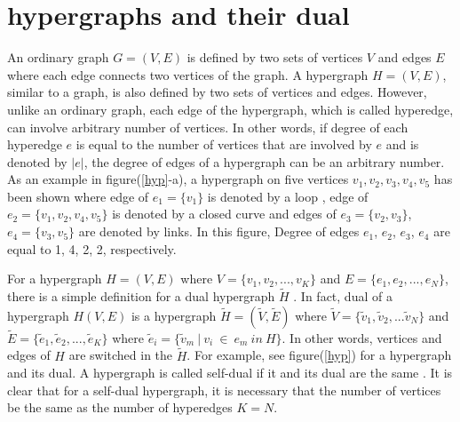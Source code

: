 \documentclass[preprintnumbers, showpacs, floatfix,twocolumn,
preprintnumbers, superscriptaddress]{revtex4}
\begin{document}
\section{hypergraphs and their dual}\label{s1}
An ordinary graph $G=(V,E)$ is defined by two sets of vertices $V$ and edges $E$ where each edge connects two vertices of the graph. A hypergraph $H=(V,E)$, similar to a graph, is also defined by two sets of vertices and edges. However, unlike an ordinary graph, each edge of the hypergraph, which is called hyperedge, can involve arbitrary number of vertices. In other words, if degree of each hyperedge $e$ is equal to the number of vertices that are involved by $e$ and is denoted by $|e|$, the degree of edges of a hypergraph can be an arbitrary number. As an example in figure(\ref{hyp}-a), a hypergraph on five vertices $v_1, v_2 , v_3 , v_4 ,v_5$ has been shown where edge of $e_1 =\{v_1 \}$ is denoted by a loop , edge of $e_2 =\{v_1 , v_2 , v_4 , v_5\}$ is denoted by a closed curve and edges of $e_3 =\{v_2 , v_3\}$, $e_4 =\{v_3 , v_5 \}$ are denoted by links. In this figure, Degree of edges $e_1$, $e_2$, $e_3$, $e_4$ are equal to 1, 4, 2, 2, respectively.

For a hypergraph $H=(V,E)$ where $ V=\{v_1 ,v_2 , ...,v_K \} $ and  $E=\{e_1 , e_2 , ...,e_N \}$, there is a simple definition for a dual hypergraph $\tilde{H}$ . In fact, dual of a hypergraph $H(V,E)$ is a hypergraph $\tilde{H}=(\tilde{V},\tilde{E})$ where $\tilde{V}=\{ \tilde{v}_1 ,\tilde{v}_2 ,...\tilde{v}_N \}$ and $\tilde{E}=\{\tilde{e}_1 ,\tilde{e}_2 ,...,\tilde{e}_K \}$ where $\tilde{e}_i =\{ \tilde{v}_m ~|~ v_i ~\in ~e_m ~in~ H \}$. In other words, vertices and edges of $H$ are switched in the $\tilde{H}$. For example,  see figure(\ref{hyp}) for a hypergraph and its dual. A hypergraph is called self-dual if it and its dual are the same \cite{Berg}. It is clear that for a self-dual hypergraph, it is necessary that the number of vertices be the same as the number of hyperedges $K=N$.
\end{document}
